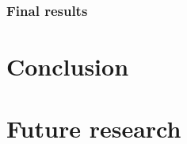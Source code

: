 \documentclass{article}
\begin{document}
\subsubsection{Final results}
\section{Conclusion}

\section{Future research}



\end{document}
